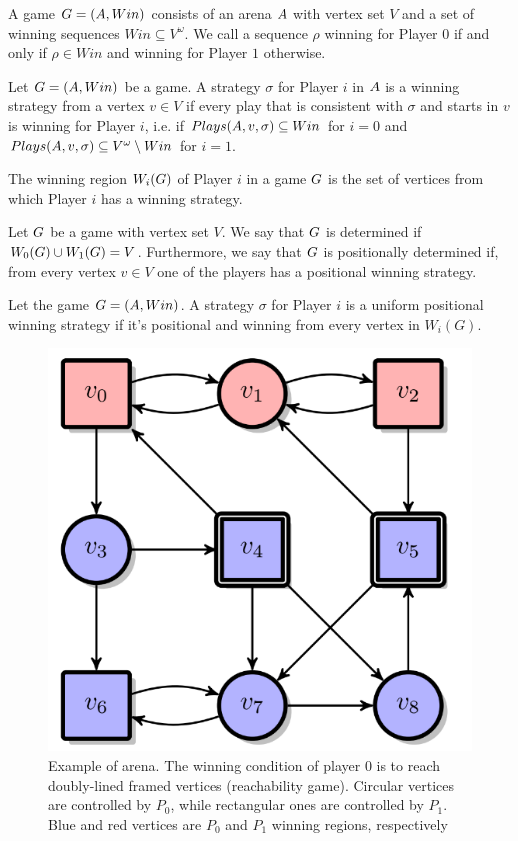 \begin{definition}
A game $G=\left( A,Win \right)$ consists of an arena $A$ with vertex set $V$ and a set of winning sequences $Win \subseteq V^\omega$. 
We call a sequence $\rho$ winning for Player $0$ if and only if $\rho \in Win$ and winning for Player $1$ otherwise.
\end{definition}

\begin{definition}
Let $G=(A,Win)$ be a game. A strategy $\sigma$ for Player $i$ in $A$ is a winning strategy from a vertex $v \in V$ if every play that is consistent with $\sigma$ and starts in $v$ is winning for Player $i$, i.e. if $Plays(A, v, \sigma) \subseteq Win$ for $i=0$ and $Plays(A, v, \sigma) \subseteq V^\omega \setminus Win$ for $i=1$. 
\end{definition}

\begin{definition}
The winning region $W_i(G)$ of Player $i$ in a game $G$ is the set of vertices from which Player $i$ has a winning strategy.
\end{definition}

\begin{definition}
Let $G$ be a game with vertex set $V$. We say that $G$ is determined if $W_0(G)\cup W_1(G) = V$. Furthermore, we say that $G$ is positionally determined if, from every vertex $v \in V$ one of the players has a positional winning strategy.
\end{definition}

\begin{definition}
Let the game $G=(A, Win)$. A strategy $\sigma$ for Player $i$ is a uniform positional winning strategy if it's positional and winning from every vertex in $W_i(G)$.
\end{definition}

\begin{figure}
    \centering
    \includegraphics[width=0.4\linewidth]{figures/arena-example.png}
    \caption{\cite{infinite-games} Example of arena. The winning condition of player $0$ is to reach doubly-lined framed vertices (reachability game). Circular vertices are controlled by $P_0$, while rectangular ones are controlled by $P_1$. Blue and red vertices are $P_0$ and $P_1$ winning regions, respectively}
    \label{fig:enter-label}
\end{figure}

